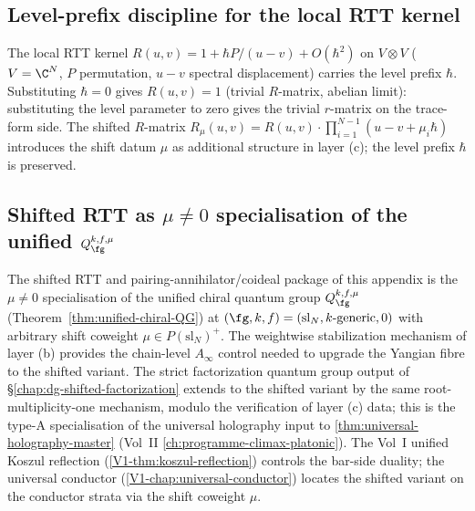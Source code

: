 \subsection{Level-prefix discipline for the local RTT kernel}
\label{subsec:shifted-rtt-rmatrix-level-prefix}

\begin{remark}
\label{rem:shifted-rtt-rmatrix-level-prefix}
The local RTT kernel $R(u, v) = 1 + \hbar P/(u-v) + O(\hbar^2)$
on $V\otimes V$ ($V = \C^N$, $P$ permutation, $u-v$ spectral
displacement) carries the level prefix $\hbar$. Substituting
$\hbar = 0$ gives $R(u,v) = 1$ (trivial $R$-matrix, abelian limit):
substituting the level parameter to zero gives the trivial
$r$-matrix on the trace-form side. The shifted $R$-matrix
$R_\mu(u, v) = R(u, v) \cdot
\prod_{i=1}^{N-1} (u-v+\mu_i\hbar)$
introduces the shift datum $\mu$ as additional structure in
layer (c); the level prefix $\hbar$ is preserved.
\end{remark}

\subsection{Shifted RTT as $\mu \ne 0$ specialisation
of the unified $Q_\fg^{k,f,\mu}$}
\label{subsec:shifted-rtt-holography-anchor}

\begin{remark}
\label{rem:shifted-rtt-uhm}
The shifted RTT and pairing-annihilator/coideal package of this appendix
is the $\mu \ne 0$ specialisation of the unified chiral quantum
group $Q_\fg^{k,f,\mu}$
(Theorem~\ref{thm:unified-chiral-QG}) at
$(\fg, k, f) = (\mathrm{sl}_N, k\text{-generic}, 0)$ with
arbitrary shift coweight $\mu \in P(\mathrm{sl}_N)^+$. The
weightwise stabilization mechanism of layer (b) provides the
chain-level $A_\infty$ control needed to upgrade the Yangian
fibre to the shifted variant. The strict factorization quantum
group output of \S\ref{chap:dg-shifted-factorization} extends
to the shifted variant by the same root-multiplicity-one mechanism,
modulo the verification of layer (c) data; this is the
type-A specialisation of the universal holography input
to \cref{thm:universal-holography-master} (Vol~II
\cref{ch:programme-climax-platonic}). The Vol~I unified Koszul reflection
(\cref{V1-thm:koszul-reflection}) controls the bar-side duality;
the universal conductor (\cref{V1-chap:universal-conductor})
locates the shifted variant on the conductor strata via the
shift coweight $\mu$.
\end{remark}
